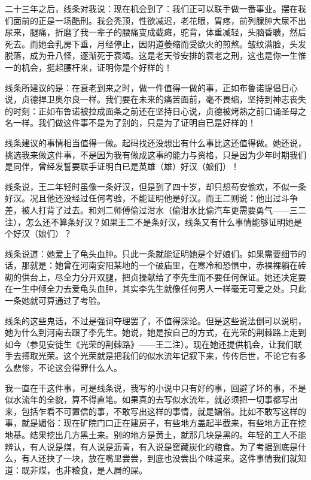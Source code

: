 二十三年之后，线条对我说：现在机会到了：我们正可以联手做一番事业。摆在我们面前的正是一场酷刑。我会秃顶，性欲减迟，老花眼，胃疼，前列腺肿大尿不出尿来，腿痛，折磨了我一辈子的腰痛变成截瘫，驼背，体重减轻，头脑昏聩，然后死去。而她会乳房下垂，月经停止，因阴道萎缩而受欲火的煎熬。皱纹满脸，头发脱落，成为丑八怪，逐渐死于衰竭。这是老天爷安排的衰老之刑，这也是你一生惟一的机会，挺起腰杆来，证明你是个好样的！ 

线条所建议的是：在衰老到来之时，做一件值得一做的事，正如布鲁诺提倡日心说，贞德捍卫奥尔良一样。我们要在未来的痛苦面前，毫不畏缩，坚持到神志丧失的时刻：正如布鲁诺被拉成面条之前还在坚持日心说，贞德被烤熟之前口诵圣母之名一样。我们做这件事不是为了别的，只是为了证明自已是好样的！ 

线条建议的事情相当值得一做。起码找还没想出有什么事比这还值得做。她还说，挑选我来做这件事，不是因为我有做成这事的能力与资格，只是因为少年时期我们是同伴，曾经发誓要联手证明白已是英雄（雄）好汉（娘们）！ 

线条说，王二年轻时虽像一条好汉，但是到了四十岁，却只想苟安偷欢，不似一条好汉。况且他还没经过任何考验，不能证明他是好汉。而王二则说：他出过斗争差，被人打背了过去。和刘二师傅偷过泔水（偷泔水比偷汽车更需要勇气——三二注），怎么还不算条好汉？如果王二不是条好汉，线条又有什么事情能够证明她是个好汉（娘们）？ 

线条说道：她爱上了龟头血肿。只此一条就能证明她是个好娘们。如果需要细节的话，那就是：她曾在河南安阳某地的一个破庙里，在寒冷和恐惧中，赤裸裸躺在砖砌的供台上，尽全力分开双腿，把贞操献给了李先生而不要任何保证。她还决定要在一生中倾全力去爱龟头血肿，其实李先生就像任何男人一样毫无可爱之处。只此一条她就可算通过了考验。 

线条的这些鬼话，不过是强词夺理罢了，不值得深论。但是这些说法倒可以说明，她为什么到河南去跟了李先生。她说，她是按自己的方式，在光荣的荆棘路上走到如今（参见安徒生《光荣的荆棘路》——王二注）。现在她还提供机会，让我们联手去搏取光荣。这个光荣就是把我们的似水流年记叙下来，传传后世，不论它有多么悲惨，不论这会得罪什么人。 

我一直在干这件事，可是线条说，我写的小说中只有好的事，回避了坏的事，不是似水流年的全貌，算不得直笔。如果真的去写似水流年，就必须把一切事都写出来，包括乍看不可置信的事，不敢写出这样的事情，就是媚俗。比如不敢写这样的事，就是媚俗：现在矿院门口正在建房子，有些地方盖起半截来，有些地方正在挖地基。结果挖出几方黑土来。别的地方是黄土，就那几块是黑的。年轻的工人不能辨认，有人说是煤，有人说是沥青，有入说是窖藏炭化的粮食。为了考据到底是什么，有人还抉了一块，放在嘴里尝尝，到底也没尝出个味道来。这件事情我们就知道：既非煤，也非粮食，是人屙的屎。 

